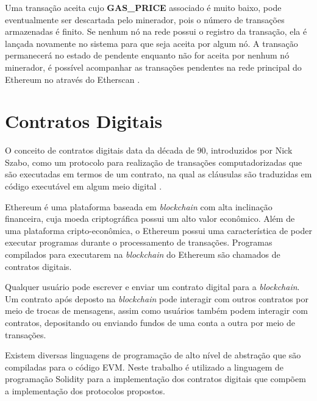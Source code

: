 \documentclass[tcc,capa]{texufpel}
\begin{document}
	Uma transação aceita cujo \textbf{GAS\_PRICE} associado é muito baixo, pode eventualmente ser descartada pelo minerador, pois o número de transações armazenadas é finito. Se nenhum nó na rede possui o registro da transação, ela é lançada novamente no sistema para que seja aceita por algum nó. A transação permanecerá no estado de pendente enquanto não for aceita por nenhum nó minerador, é possível acompanhar as transações pendentes na rede principal do Ethereum no através do Etherscan \cite{team2017etherscan}.

	
	
	
	\section{Contratos Digitais}
	
	O conceito de contratos digitais data da década de 90, introduzidos por Nick Szabo, como um protocolo para realização de transações computadorizadas que são executadas em termos de um contrato, na qual as cláusulas são traduzidas em código executável em algum meio digital \cite{szabo1997}.
	
	Ethereum é uma plataforma baseada em \textit{blockchain} com alta inclinação financeira, cuja moeda criptográfica possui um alto valor econômico. Além de uma plataforma cripto-econômica, o Ethereum possui uma característica de poder executar programas durante o processamento de transações. Programas compilados para executarem na \textit{blockchain} do Ethereum são chamados de contratos digitais.
	
	Qualquer usuário pode escrever e enviar um contrato digital para a \textit{blockchain}. Um contrato após deposto na \textit{blockchain} pode interagir com outros contratos por meio de trocas de mensagens, assim como usuários também podem interagir com contratos, depositando ou enviando fundos de uma conta a outra por meio de transações.
	
	Existem diversas linguagens de programação de alto nível de abstração que são compiladas para o código EVM. Neste trabalho é utilizado a linguagem de programação Solidity \cite{dannen2017introducing} para a implementação dos contratos digitais que compõem a implementação dos protocolos propostos.
\end{document}
